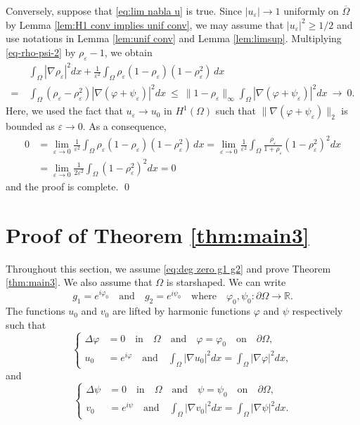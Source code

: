\documentclass[a4paper,10pt,reqno]{amsart}
\theoremstyle{definition}
\newcommand{\rone}{\mathbb{R}}
\newcommand{\ve}{{\varepsilon}}
\newcommand{\vp}{{\varphi}}
\newcommand{\Om}{{\Omega}}
\newcommand{\pa}{\partial}
\newcommand{\qand}{{\quad \mbox{and} \quad}}
\newcommand{\qin}{{\quad \mbox{in} \quad}}
\newcommand{\qon}{{\quad \mbox{on} \quad}}
\newcommand{\qwhere}{{\quad \mbox{where} \quad}}
\numberwithin{equation}{section}
\begin{document}
Conversely, suppose that \eqref{eq:lim nabla u} is true.
Since $|u_\ve| \to 1$ uniformly on $\overline\Om$ by Lemma \ref{lem:H1 conv implies unif conv}, we may assume that $|u_\ve|^2 \ge 1/2$ and use notations in Lemma \ref{lem:unif conv} and Lemma \ref{lem:limsup}.
Multiplying \eqref{eq-rho-psi-2} by $\rho_\ve -1$, we obtain
\begin{align*}
& \int_\Omega |\nabla \rho_\varepsilon|^2  dx +\frac{1}{\ve^2}  \int_\Omega \rho_\ve(1- \rho_\varepsilon  )(1- \rho_\ve^2) \,dx  \\
=~& \int_\Omega (\rho_\ve - \rho_\ve^2) | \nabla (\varphi + \psi_\varepsilon )|^2 dx ~\le ~ \| 1- \rho_\ve \|_\infty \int_\Omega   | \nabla (\varphi + \psi_\varepsilon )|^2 dx ~\to ~ 0.
\end{align*}
Here, we used the fact that $u_\ve \to u_0$ in $H^1(\Om)$ such that $ \| \nabla (\varphi + \psi_\varepsilon )\|_2$ is bounded as $\ve \to 0$.
As a consequence,
\begin{align*}
 0&=\lim_{\ve \to 0} \frac{1}{\ve^2}  \int_\Omega \rho_\ve(1- \rho_\varepsilon  )(1- \rho_\ve^2) \,dx=
\lim_{\ve \to 0} \frac{1}{\ve^2}   \int_\Omega \frac{\rho_\ve}{1+\rho_\ve}  (1- \rho_\ve^2)^2dx \\
&=
\lim_{\ve \to 0} \frac{1}{2\ve^2} \int_\Om (1-\rho_\ve^2)^2 dx = 0
\end{align*}
and the proof is complete.
\qed





 \bigskip
\section{Proof of Theorem \ref{thm:main3}}\label{sec:thm pf main3}


Throughout this section, we assume \eqref{eq:deg zero g1 g2} and prove Theorem \ref{thm:main3}.
We also assume that   $\Om$ is starshaped. 
We can write
\[ g_1 = e^{i \vp_0} \qand g_2= e^{i \psi_0} \qwhere \vp_0, \psi_0:  \pa \Om \to \rone.
\]
The functions $u_0$ and $v_0$ are  lifted by   harmonic functions $\varphi$ and $\psi$ respectively  such that
\begin{equation}\label{eq:phi sys}
\left\{
\begin{aligned}
\Delta \vp & =0 \qin \Om \qand \vp=\vp_0 \qon \pa \Om,\\
u_0 &= e^{i \varphi} \qand \int_\Omega |\nabla u_0|^2 dx =\int_\Omega |\nabla \vp|^2 dx,
 \end{aligned}
 \right.
 \end{equation}
 and
\begin{equation}\label{eq:psi sys}
\left\{
\begin{aligned}
\Delta \psi & =0 \qin \Om \qand \psi=\psi_0 \qon \pa \Om,\\
v_0 &= e^{i \psi} \qand \int_\Omega |\nabla v_0|^2 dx =\int_\Omega |\nabla \psi|^2 dx.
 \end{aligned}
 \right.
 \end{equation}
\end{document}
